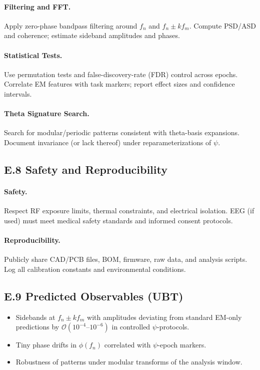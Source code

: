\paragraph{Filtering and FFT.} 
Apply zero-phase bandpass filtering around $f_n$ and $f_n\pm k f_m$.
Compute PSD/ASD and coherence; estimate sideband amplitudes and phases.

\paragraph{Statistical Tests.} 
Use permutation tests and false-discovery-rate (FDR) control across epochs.
Correlate EM features with task markers; report effect sizes and confidence intervals.

\paragraph{Theta Signature Search.} 
Search for modular/periodic patterns consistent with theta-basis expansions.
Document invariance (or lack thereof) under reparameterizations of $\psi$.

\subsection*{E.8 Safety and Reproducibility}
\paragraph{Safety.}
Respect RF exposure limits, thermal constraints, and electrical isolation.
EEG (if used) must meet medical safety standards and informed consent protocols.

\paragraph{Reproducibility.}
Publicly share CAD/PCB files, BOM, firmware, raw data, and analysis scripts.
Log all calibration constants and environmental conditions.

\subsection*{E.9 Predicted Observables (UBT)}
\begin{itemize}
\item Sidebands at $f_n \pm k f_m$ with amplitudes deviating from standard EM-only predictions by $\mathcal{O}(10^{-4}\text{--}10^{-6})$ in controlled $\psi$-protocols.
\item Tiny phase drifts in $\phi(f_n)$ correlated with $\psi$-epoch markers.
\item Robustness of patterns under modular transforms of the analysis window.
\end{itemize}

